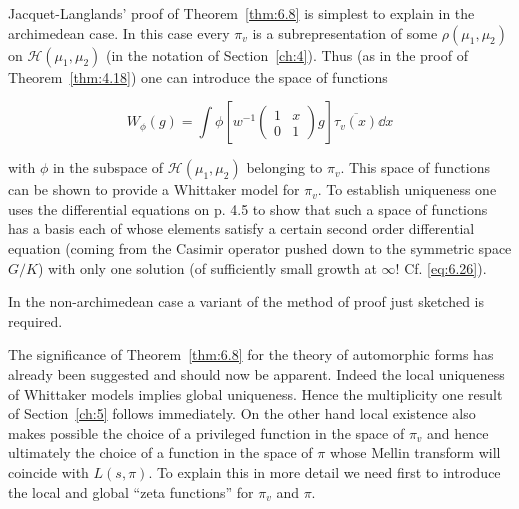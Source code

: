 \begin{remark}\label{rem:6.10}

Jacquet-Langlands' proof of Theorem~\ref{thm:6.8} is simplest to explain in the archimedean case. In this case every $\pi_v$ is a subrepresentation of some $\rho(\mu_1, \mu_2)$ on $\mathcal{H}(\mu_1, \mu_2)$ (in the notation of Section~\ref{ch:4}). Thus (as in the proof of Theorem~\ref{thm:4.18}) one can introduce the space of functions

\begin{equation}\label{eq:6.27}
W_{\phi}(g) = \int \phi\!\left[ w^{-1}\begin{pmatrix} 1 & x \\ 0 & 1 \end{pmatrix} g \right] \overline{\tau_v(x)} \dd x\tag{6.27}
\end{equation}

with $\phi$ in the subspace of $\mathcal{H}(\mu_1, \mu_2)$ belonging to $\pi_v$. This space of functions can be shown to provide a Whittaker model for $\pi_v$. To establish uniqueness one uses the differential equations on p. 4.5 to show that such a space of functions has a basis each of whose elements satisfy a certain second order differential equation (coming from the Casimir operator pushed down to the symmetric space $G/K$) with only one solution (of sufficiently small growth at $\infty$! Cf. \eqref{eq:6.26}).

In the non-archimedean case a variant of the method of proof just sketched is required.

\end{remark}

The significance of Theorem~\ref{thm:6.8} for the theory of automorphic forms has already been suggested and should now be apparent. Indeed the local uniqueness of Whittaker models implies global uniqueness. Hence the multiplicity one result of Section~\ref{ch:5} follows immediately. On the other hand local existence also makes possible the choice of a privileged function in the space of $\pi_v$ and hence ultimately the choice of a function in the space of $\pi$ whose Mellin transform will coincide with $L(s, \pi)$. To explain this in more detail we need first to introduce the local and global ``zeta functions'' for $\pi_v$ and $\pi$.

